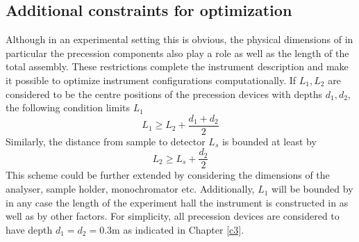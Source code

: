 \documentclass{article}
\begin{document}

\subsection{Additional constraints for optimization}
\label{c5.1}
Although in an experimental setting this is obvious, the physical dimensions of in particular the precession components also play a role as well as the length of the total assembly. These restrictions complete the instrument description and make it possible to optimize instrument configurations computationally. If $L_1, L_2$ are considered to be the centre positions of the precession devices with depths $d_1, d_2$, the following condition limits $L_1$
$$L_1 \geq L_2 + \frac{d_1 + d_2}{2}$$
Similarly, the distance from sample to detector $L_s$ is bounded at least by
$$L_2 \geq L_s + \frac{d_2}{2}$$
This scheme could be further extended by considering the dimensions of the analyser, sample holder, monochromator etc. Additionally, $L_1$  will be bounded by in any case the length of the experiment hall the instrument is constructed in as well as by other factors. For simplicity, all precession devices are considered to have depth $d_1 = d_2 = 0.3\unit\meter$ as indicated in Chapter \ref{c3}. 

\end{document}

